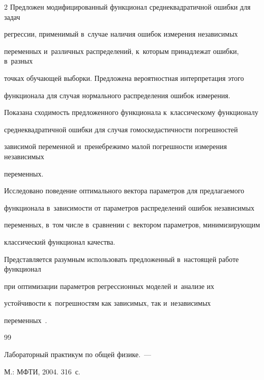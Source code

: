 \begin{multicols}{2}
Предложен модифицированный функционал среднеквадратичной ошибки для задач

регрессии, применимый в~случае наличия ошибок измерения независимых

переменных и~различных распределений, к~которым принадлежат ошибки, в~разных

точках обучающей выборки. Предложена вероятностная интерпретация этого

функционала для случая нормального распределения ошибок измерения.



Показана сходимость предложенного функционала к~классическому функционалу

сред\-не\-квад\-ра\-тич\-ной ошибки для случая гомоскедастичности погрешностей

зависимой переменной и~пренебрежимо малой погрешности измерения независимых

переменных.



Исследовано поведение оптимального вектора параметров для предлагаемого

функционала в~зависимости от параметров распределений ошибок независимых

переменных, в~том числе в~сравнении с~вектором параметров, минимизирующим

классический функционал качества.



Представляется разумным использовать предложенный в~настоящей работе функционал

при оптимизации параметров регрессионных моделей и~анализе их

устойчивости к~погрешностям как зависимых, так и~независимых

переменных~\cite{Rudoy15MonteCarlo,Rudoy16StabilityAnalysis}.





{\small\frenchspacing

 {%


 \begin{thebibliography}{99}



Лабораторный практикум по общей физике.~---

М.: МФТИ, 2004. 316~с.




\end{thebibliography}}}
\end{multicols}
